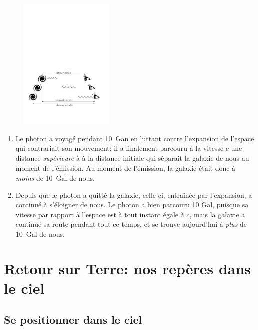 \documentclass[a4paper,10pt]{report}
\begin{document}
\begin{Answer}
  \begin{figure}
    \centering
    \includegraphics[width=0.4\textwidth]{expansion}
  \end{figure}
  \begin{enumerate}
  \item Le photon a voyagé pendant 10~Gan en luttant contre
    l'expansion de l'espace qui contrariait son mouvement; il a
    finalement parcouru à la vitesse $c$ une distance
    \emph{supérieure} à à la distance initiale qui séparait la galaxie
    de nous au moment de l'émission.  Au moment de l'émission, la
    galaxie était donc à \emph{moins} de 10~Gal de nous.
  \item Depuis que le photon a quitté la galaxie, celle-ci, entraînée
    par l'expansion, a continué à s'éloigner de nous.  Le photon a
    bien parcouru 10 Gal, puisque sa vitesse par rapport à l'espace
    est à tout instant égale à $c$, mais la galaxie a continué sa
    route pendant tout ce temps, et se trouve aujourd'hui à
    \emph{plus} de 10~Gal de nous.
  \end{enumerate}
\end{Answer}


\chapter{Retour sur Terre: nos repères dans le ciel}

\section{Se positionner dans le ciel}
\end{document}
